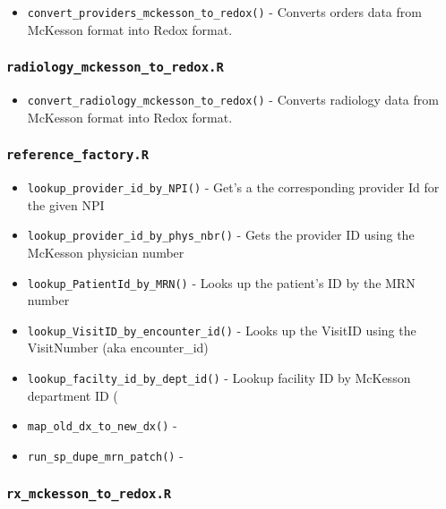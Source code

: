 \documentclass[
]{book}
\providecommand{\tightlist}{%
  \setlength{\itemsep}{0pt}\setlength{\parskip}{0pt}}
\begin{document}
\begin{itemize}
\tightlist
\item
  \texttt{convert\_providers\_mckesson\_to\_redox()} - Converts orders data from McKesson format into Redox format.
\end{itemize}

\hypertarget{radiology_mckesson_to_redox.r}{%
\subsubsection{\texorpdfstring{\texttt{radiology\_mckesson\_to\_redox.R}}{radiology\_mckesson\_to\_redox.R}}\label{radiology_mckesson_to_redox.r}}

\begin{itemize}
\tightlist
\item
  \texttt{convert\_radiology\_mckesson\_to\_redox()} - Converts radiology data from McKesson format into Redox format.
\end{itemize}

\hypertarget{reference_factory.r}{%
\subsubsection{\texorpdfstring{\texttt{reference\_factory.R}}{reference\_factory.R}}\label{reference_factory.r}}

\begin{itemize}
\tightlist
\item
  \texttt{lookup\_provider\_id\_by\_NPI()} - Get's a the corresponding provider Id for the given NPI
\item
  \texttt{lookup\_provider\_id\_by\_phys\_nbr()} - Gets the provider ID using the McKesson physician number
\item
  \texttt{lookup\_PatientId\_by\_MRN()} - Looks up the patient's ID by the MRN number
\item
  \texttt{lookup\_VisitID\_by\_encounter\_id()} - Looks up the VisitID using the VisitNumber (aka encounter\_id)
\item
  \texttt{lookup\_facilty\_id\_by\_dept\_id()} - Lookup facility ID by McKesson department ID (
\item
  \texttt{map\_old\_dx\_to\_new\_dx()} -
\item
  \texttt{run\_sp\_dupe\_mrn\_patch()} -
\end{itemize}

\hypertarget{rx_mckesson_to_redox.r}{%
\subsubsection{\texorpdfstring{\texttt{rx\_mckesson\_to\_redox.R}}{rx\_mckesson\_to\_redox.R}}\label{rx_mckesson_to_redox.r}}
\end{document}
